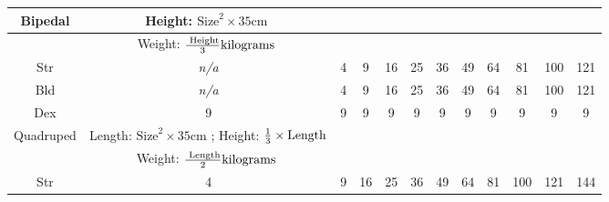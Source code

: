 \documentclass[twoside]{book}
\begin{document}
\begin{table}[htb]
\begin{center}
\begin{tabular}{|c|c|c|c|c|c|c|c|c|c|c|c|}
\hline

 Bipedal &  Height: \begin{math}    
                        {\textrm{Size}}^{ 2 }   \times   35 \textrm{cm
                          }    \end{math}
                  \\

\hline

& Weight: \begin{math}    {{\textrm{
                     Height}}\over{ 3 }}  \textrm{kilograms
                    }    \end{math}
                  \\

\hline

 Str &
                    \textit{n/a}
                  & 4 & 9 & 16 & 25 & 36 & 49 & 64 & 81 & 100 & 121 \\

\hline

 Bld &
                    \textit{n/a}
                  & 4 & 9 & 16 & 25 & 36 & 49 & 64 & 81 & 100 & 121 \\

\hline

 Dex & 9 & 9 & 9 & 9 & 9 & 9 & 9 & 9 & 9 & 9 & 9 \\

\hline

 Quadruped &  Length: \begin{math}  
                        {\textrm{Size}}^{ 2 }   \times     35 \textrm{
                           cm}  \end{math} ; Height: \begin{math} 
                           {{ 1 }\over{ 3 }}  
                           \times    \textrm{Length}  \end{math}
                  \\

\hline

&  Weight: \begin{math}    {{\textrm{
                     Length}}\over{ 2 }}  \textrm{kilograms
                    }    \end{math}
                  \\

\hline

 Str & 4 & 9 & 16 & 25 & 36 & 49 & 64 & 81 & 100 & 121 & 144 \\

\hline


\end{tabular}
\end{center}
\end{table}
\end{document}
